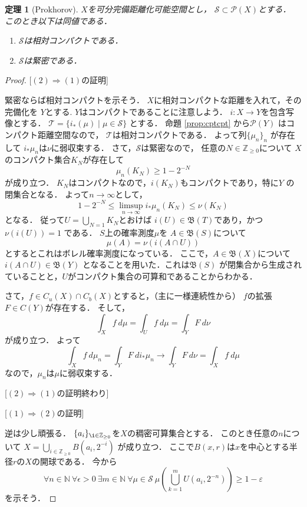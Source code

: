 \documentclass[leqno, a4paper, 12pt]{jsarticle}
\newtheorem{thm}{定理}
\newcommand{\To}{\Longrightarrow}
\newcommand{\nn}{\mathbb{N}}
\newcommand{\zz}{\mathbb{Z}}
\newcommand{\ep}{\varepsilon}
\begin{document}
\begin{thm}[Prokhorov]\label{thm:prokh}
$X$を可分完備距離化可能空間とし，
$\mathcal{S}\subset \mathcal{P}(X)$とする．
このとき以下は同値である．
\begin{enumerate}
\item $\mathcal{S}$は相対コンパクトである．
\item $\mathcal{S}$は緊密である．
\end{enumerate}

\end{thm}
\begin{proof}

[$(2)\To (1)$の証明]

緊密ならば相対コンパクトを示そう．
$X$に相対コンパクトな距離を入れて，その完備化を
$Y$とする.
$Y$はコンパクトであることに注意しよう．
$i: X\to Y$を包含写像とする．
$\mathcal{T}=\{i_*(\mu)\mid \mu\in \mathcal{S}\}$
とする．
命題 \ref{prop:cptcpt}
から$\mathcal{P}(Y)$
はコンパクト距離空間なので，
$\mathcal{T}$は相対コンパクトである．
よって列$\{\mu_n\}_n$
が存在して
$i_*\mu_n$は$\nu$に弱収束する．
さて，$\mathcal{S}$は緊密なので，
任意の$N\in \zz_{\ge 0}$について
$X$のコンパクト集合$K_N$が存在して
\[
\mu_n(K_N)\ge 1-2^{-N}
\]
が成り立つ．
$K_N$はコンパクトなので，$i(K_N)$もコンパクトであり，特に$Y$
の閉集合となる．
よって$n\to \infty$として，
\[
1-2^{-N}\le \limsup_{n\to \infty}i_*\mu_n(K_N)\le \nu(K_N)
\]
となる．
従って$U=\bigcup_{N=1}K_N$とおけば
$i(U)\in \mathfrak{B}(T)$であり，かつ$\nu(i(U))=1$
である．
$S$上の確率測度$\mu$を
$A\in \mathfrak{B}(S)$について
\[
\mu(A)=\nu(i(A\cap U))
\]
とするとこれはボレル確率測度になっている．
ここで，$A\in \mathfrak{B}(X)$について
$i(A\cap U)\in \mathfrak{B}(Y)$
となることを用いた．これは$\mathfrak{B}(S)$
が閉集合から生成されていることと，$U$がコンパクト集合の可算和であることからわかる．

さて，$f\in C_u(X)\cap C_b(X)$とすると，（主に一様連続性から）
$f$の拡張$F\in C(Y)$が存在する．
そして，
\[
\int_{X} f\ d\mu=\int_{U}f\ d\mu =\int_{Y} F\ d\nu
\]
が成り立つ．
よって
\[
\int_{X} f\ d\mu_{n}=\int_{Y} F\ di_*\mu_n
\to 
\int_{Y}F\ d\nu=\int_{X}f \ d\mu
\]
なので，$\mu_n$は$\mu$に弱収束する．

[$(2)\To (1)$の証明終わり]

[$(1)\To (2)$の証明]

逆は少し頑張る．
$\{a_i\}_{\i\in \zz_{\ge 0}}$を$X$の稠密可算集合とする．
このとき任意の$n$について
$X=\bigcup_{i\in \zz_{\ge 0}}B(a_i, 2^{-i})$
が成り立つ．
ここで$B(x, r)$は$x$を中心とする半径$r$の$X$の開球である．
今から
\[
	\forall n\in \nn\  
	\forall \epsilon>0 \ 
	\exists m\in \nn \ 
	\forall \mu\in \mathcal{S}\
	\mu\left(\bigcup_{k=1}^mU(a_i, 2^{-n})\right)\ge 1-\ep
\]
を示そう．


\end{proof}
\end{document}
